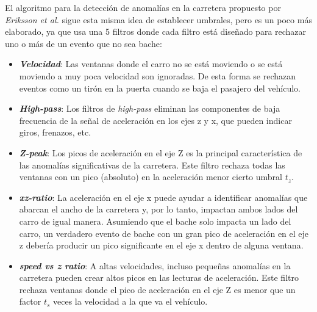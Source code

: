 		El algoritmo para la detección de anomalías en la carretera propuesto por \emph{Eriksson et al.} sigue
		esta misma idea de establecer umbrales, pero es un poco más elaborado, ya que usa una 5 filtros donde cada filtro está diseñado
		para rechazar uno o más de un evento que no sea bache:\\

		\begin{itemize}
			\item \emph{\textbf {Velocidad}}: Las ventanas donde el carro no se está moviendo o se está moviendo a muy poca velocidad son ignoradas. 
				De esta forma se rechazan eventos como un tirón en la puerta cuando se baja el pasajero del vehículo.\\
			\item \emph{\textbf {High-pass}}: Los filtros de \emph{high-pass} eliminan las componentes de baja frecuencia de la señal de aceleración
				en los ejes z y x, que pueden indicar giros, frenazos, etc.\\
			\item  \emph{\textbf {Z-peak}}: Los picos de aceleración en el eje Z es la principal característica de las anomalías significativas de
				la carretera. Este filtro rechaza todas las ventanas con un pico (absoluto) en la aceleración menor cierto umbral $t_z$.\\
			\item \emph{\textbf {xz-ratio}}: La aceleración en el eje x puede ayudar a identificar anomalías que abarcan el ancho de la carretera
				y, por lo tanto, impactan ambos lados del carro de igual manera.  Asumiendo que el bache solo impacta un lado del carro, un verdadero
				evento de bache con un gran pico de aceleración en el eje z debería producir un pico significante en el eje x dentro de alguna
				ventana.\\
			\item \emph{\textbf {speed vs z ratio}}: A altas velocidades, incluso pequeñas anomalías en la carretera pueden crear altos picos en las
				lecturas de aceleración. Este filtro rechaza ventanas donde el pico de aceleración en el eje Z es menor que un factor $t_s$ veces la
				velocidad a la que va el vehículo.
		\end{itemize}

